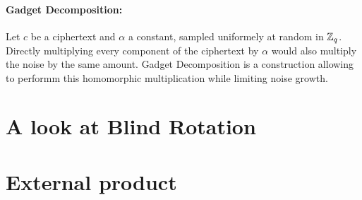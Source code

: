\paragraph{Gadget Decomposition: }


Let $c$ be a \LWE ciphertext and $\alpha$ a constant, sampled uniformely at random in $\mathbb{Z}_q$. Directly multiplying every component of the ciphertext by $\alpha$ would also multiply the noise by the same amount. Gadget Decomposition is a construction allowing to performm this homomorphic multiplication while limiting noise growth.





\section{A look at Blind Rotation}




\section{External product}


